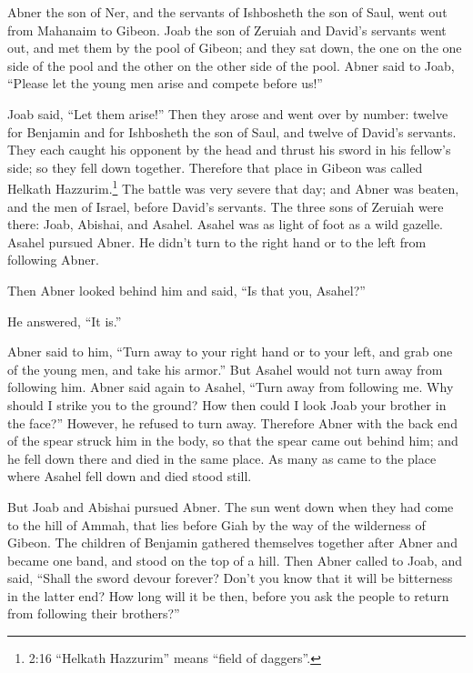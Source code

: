 \myverse{}Abner the son of Ner, and the servants of Ishbosheth the son
of Saul, went out from Mahanaim to Gibeon.
\myverse{}Joab the son of Zeruiah and David’s servants went out, and met them by the
pool of Gibeon; and they sat down, the one on the one side of the pool and the other on the other side
of the pool.
\myverse{}Abner said to Joab, “Please let the young men arise and compete before us!”

Joab said, “Let them arise!”
\myverse{}Then they arose and went over by number: twelve for Benjamin and for Ishbosheth
the son of Saul, and twelve of David’s servants.
\myverse{}They each caught his opponent by the head and thrust his sword in his fellow’s
side; so they fell down together. Therefore that place in Gibeon was called Helkath Hazzurim.\footnote{2:16 “Helkath Hazzurim” means “field of daggers”.}
\myverse{}The battle was very severe that day; and Abner was beaten, and the men of
Israel, before David’s servants.
\myverse{}The three sons of Zeruiah were there: Joab, Abishai, and Asahel. Asahel was
as light of foot as a wild gazelle.
\myverse{}Asahel pursued Abner. He didn’t turn to the right hand or to the left from
following Abner.

\myverse{}Then Abner looked behind him and said, “Is that you, Asahel?”

He answered, “It is.”

\myverse{}Abner said to him, “Turn away to your right hand or to your left,
and grab one of the young men, and take his armor.” But Asahel would not turn away from following him.
\myverse{}Abner said again to Asahel, “Turn away from following me. Why should I strike
you to the ground? How then could I look Joab your brother in the face?”
\myverse{}However, he refused to turn away. Therefore Abner with the back end of the
spear struck him in the body, so that the spear came out behind him; and he fell down there and died in
the same place. As many as came to the place where Asahel fell down and died stood still.

\myverse{}But Joab and Abishai pursued Abner. The sun went down when they
had come to the hill of Ammah, that lies before Giah by the way of the wilderness of Gibeon.
\myverse{}The children of Benjamin gathered themselves together after Abner and became
one band, and stood on the top of a hill.
\myverse{}Then Abner called to Joab, and said, “Shall the sword devour forever? Don’t
you know that it will be bitterness in the latter end? How long will it be then, before you ask the people
to return from following their brothers?”

